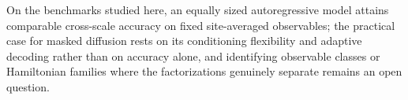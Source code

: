 

On the benchmarks studied here, an equally sized autoregressive model
attains comparable cross-scale accuracy on fixed site-averaged
observables; the practical case for masked diffusion rests on its
conditioning flexibility and adaptive decoding rather than on accuracy
alone, and identifying observable classes or Hamiltonian families where
the factorizations genuinely separate remains an open question.
